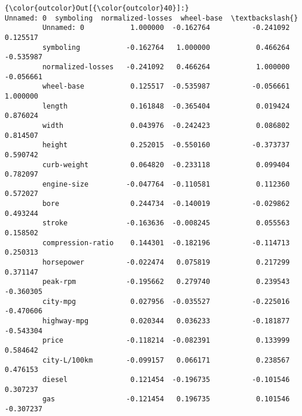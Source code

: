 \documentclass[11pt]{article}
\begin{document}
\begin{Verbatim}[commandchars=\\\{\}]
{\color{outcolor}Out[{\color{outcolor}40}]:}                    Unnamed: 0  symboling  normalized-losses  wheel-base  \textbackslash{}
         Unnamed: 0           1.000000  -0.162764          -0.241092    0.125517   
         symboling           -0.162764   1.000000           0.466264   -0.535987   
         normalized-losses   -0.241092   0.466264           1.000000   -0.056661   
         wheel-base           0.125517  -0.535987          -0.056661    1.000000   
         length               0.161848  -0.365404           0.019424    0.876024   
         width                0.043976  -0.242423           0.086802    0.814507   
         height               0.252015  -0.550160          -0.373737    0.590742   
         curb-weight          0.064820  -0.233118           0.099404    0.782097   
         engine-size         -0.047764  -0.110581           0.112360    0.572027   
         bore                 0.244734  -0.140019          -0.029862    0.493244   
         stroke              -0.163636  -0.008245           0.055563    0.158502   
         compression-ratio    0.144301  -0.182196          -0.114713    0.250313   
         horsepower          -0.022474   0.075819           0.217299    0.371147   
         peak-rpm            -0.195662   0.279740           0.239543   -0.360305   
         city-mpg             0.027956  -0.035527          -0.225016   -0.470606   
         highway-mpg          0.020344   0.036233          -0.181877   -0.543304   
         price               -0.118214  -0.082391           0.133999    0.584642   
         city-L/100km        -0.099157   0.066171           0.238567    0.476153   
         diesel               0.121454  -0.196735          -0.101546    0.307237   
         gas                 -0.121454   0.196735           0.101546   -0.307237   
         

\end{Verbatim}
\end{document}
